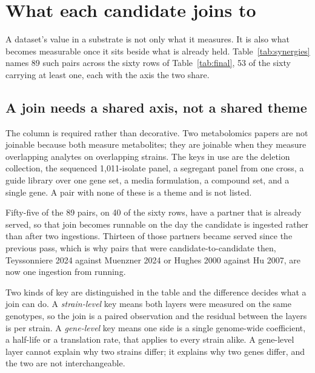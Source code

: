 
\section{What each candidate joins to}\label{sec:synergies}

A dataset's value in a substrate is not only what it measures. It is also what becomes
measurable once it sits beside what is already held. Table~\ref{tab:synergies} names 89
such pairs across the sixty rows of Table~\ref{tab:final}, 53 of the sixty carrying at
least one, each with the axis the two share.

\subsection{A join needs a shared axis, not a shared theme}

The  column is required rather than decorative. Two metabolomics papers are
not joinable because both measure metabolites; they are joinable when they measure
overlapping analytes on overlapping strains. The keys in use are the deletion collection,
the sequenced 1,011-isolate panel, a segregant panel from one cross, a guide library over
one gene set, a media formulation, a compound set, and a single gene. A pair with none of
these is a theme and is not listed.

Fifty-five of the 89 pairs, on 40 of the sixty rows, have a partner that is already
served, so that join becomes runnable on the day the candidate is ingested rather than
after two ingestions. Thirteen of those partners became served since the previous pass,
which is why pairs that were candidate-to-candidate then, Teyssonniere 2024 against
Muenzner 2024 or Hughes 2000 against Hu 2007, are now one ingestion from running.

Two kinds of key are distinguished in the table and the difference decides what a join can
do. A \emph{strain-level} key means both layers were measured on the same genotypes, so
the join is a paired observation and the residual between the layers is per strain. A
\emph{gene-level} key means one side is a single genome-wide coefficient, a half-life or a
translation rate, that applies to every strain alike. A gene-level layer cannot explain why
two strains differ; it explains why two genes differ, and the two are not interchangeable.

